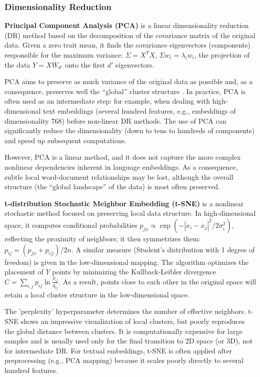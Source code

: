 \subsubsection{Dimensionality Reduction}
\textbf{Principal Component Analysis (PCA)} is a linear dimensionality reduction (DR) method based
on the decomposition of the covariance matrix of the original data. Given a zero trait mean,
it finds the covariance eigenvectors (components) responsible for the maximum variance:
$\Sigma = X^T X$, $\Sigma w_i = \lambda_i w_i$, the projection of the data $Y = XW_{d'}$
onto the first $d'$ eigenvectors.

PCA aims to preserve as much variance of the original data as possible and, as a consequence,
preserves well the “global” cluster structure \parencite{TRIMAP2019}. In practice, PCA is often
used as an intermediate step: for example, when dealing with high-dimensional text embeddings
(several hundred features, e.g., embeddings of dimensionality 768) before non-linear
DR methods. The use of PCA can significantly reduce the dimensionality
(down to tens to hundreds of components) and speed up subsequent computations\parencite{huang2022towards}.

However, PCA is a linear method, and it does not capture the more complex nonlinear dependencies
inherent in language embeddings. As a consequence, subtle local word-document relationships
may be lost, although the overall structure (the “global landscape” of the data) is most often
preserved.

\textbf{t-distribution Stochastic Meighbor Embedding (t-SNE)} is a nonlinear stochastic method focused
on preserving local data structure. In high-dimensional space, it computes conditional probabilities
$p_{j|i} \propto \exp(-|x_i-x_j|^2/2\sigma_i^2)$, reflecting the proximity of neighbors; it then
symmetrizes them: $p_{ij}=(p_{j|i}+p_{i|j})/2n$. A similar measure (Student's distribution with 1 degree
of freedom) is given in the low-dimensional mapping. The algorithm optimizes the placement of $Y$ points
by minimizing the Kullback-Leibler divergence $C = \sum_{i,j} p_{ij}\ln\frac{p_{ij}}{q_{ij}}$.
As a result, points close to each other in the original space will retain a local cluster structure
in the low-dimensional space.

The 'perplexity' hyperparameter determines the number of effective neighbors. t-SNE shows an impressive
visualization of local clusters, but poorly reproduces the global distance between clusters.
It is computationally expensive for large samples and is usually used only for the final transition
to 2D space (or 3D), not for intermediate DR. For textual embeddings, t-SNE is
often applied after preprocessing (e.g., PCA mapping) because it scales poorly directly
to several hundred features.

